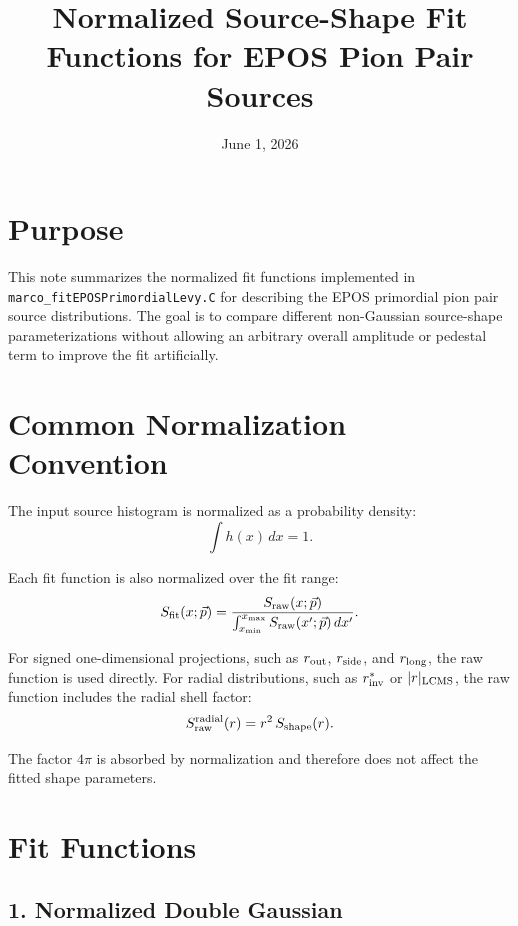 \documentclass[11pt]{article}
\title{Normalized Source-Shape Fit Functions for EPOS Pion Pair Sources}
\author{}
\date{June 1, 2026}
\begin{document}
\maketitle

\section*{Purpose}

This note summarizes the normalized fit functions implemented in
\texttt{marco\_fitEPOSPrimordialLevy.C} for describing the EPOS primordial
pion pair source distributions. The goal is to compare different
non-Gaussian source-shape parameterizations without allowing an arbitrary
overall amplitude or pedestal term to improve the fit artificially.

\section*{Common Normalization Convention}

The input source histogram is normalized as a probability density:
\begin{equation}
  \int h(x)\,dx = 1.
\end{equation}

Each fit function is also normalized over the fit range:
\begin{equation}
  S_{\rm fit}(x;\vec p)
  =
  \frac{S_{\rm raw}(x;\vec p)}
       {\int_{x_{\rm min}}^{x_{\rm max}} S_{\rm raw}(x';\vec p)\,dx'}.
\end{equation}

For signed one-dimensional projections, such as
\(r_{\rm out}\), \(r_{\rm side}\), and \(r_{\rm long}\), the raw function is
used directly. For radial distributions, such as \(r_{\rm inv}^{*}\) or
\(|r|_{\rm LCMS}\), the raw function includes the radial shell factor:
\begin{equation}
  S_{\rm raw}^{\rm radial}(r)
  =
  r^2\,S_{\rm shape}(r).
\end{equation}

The factor \(4\pi\) is absorbed by normalization and therefore does not affect
the fitted shape parameters.

\section*{Fit Functions}

\subsection*{1. Normalized Double Gaussian}
\end{document}
